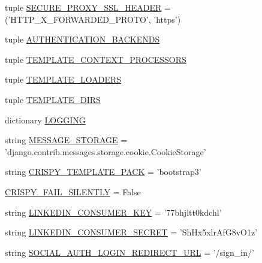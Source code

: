 \begin{DoxyCompactItemize}
tuple \hyperlink{namespaceleapkit_1_1settings_1_1base__settings__local_ad6825b5757c72d05e2a1f900736ebe11}{S\-E\-C\-U\-R\-E\-\_\-\-P\-R\-O\-X\-Y\-\_\-\-S\-S\-L\-\_\-\-H\-E\-A\-D\-E\-R} = ('H\-T\-T\-P\-\_\-\-X\-\_\-\-F\-O\-R\-W\-A\-R\-D\-E\-D\-\_\-\-P\-R\-O\-T\-O', 'https')
\item 
tuple \hyperlink{namespaceleapkit_1_1settings_1_1base__settings__local_a6f21fb23c56e83f779bdafbae0f1f2de}{A\-U\-T\-H\-E\-N\-T\-I\-C\-A\-T\-I\-O\-N\-\_\-\-B\-A\-C\-K\-E\-N\-D\-S}
\item 
tuple \hyperlink{namespaceleapkit_1_1settings_1_1base__settings__local_ac5c82a1f7d9b49e7795440b5bdcc4d73}{T\-E\-M\-P\-L\-A\-T\-E\-\_\-\-C\-O\-N\-T\-E\-X\-T\-\_\-\-P\-R\-O\-C\-E\-S\-S\-O\-R\-S}
\item 
tuple \hyperlink{namespaceleapkit_1_1settings_1_1base__settings__local_a4d3aea07c3fb548eda4abf846e9f396f}{T\-E\-M\-P\-L\-A\-T\-E\-\_\-\-L\-O\-A\-D\-E\-R\-S}
\item 
tuple \hyperlink{namespaceleapkit_1_1settings_1_1base__settings__local_a6c20dac1e8a2669ee57c65b45fb66bbf}{T\-E\-M\-P\-L\-A\-T\-E\-\_\-\-D\-I\-R\-S}
\item 
dictionary \hyperlink{namespaceleapkit_1_1settings_1_1base__settings__local_a09597bb472de58a72c8ca258d2284db5}{L\-O\-G\-G\-I\-N\-G}
\item 
string \hyperlink{namespaceleapkit_1_1settings_1_1base__settings__local_a9a45f01b8d46d421bcbe726db679a13b}{M\-E\-S\-S\-A\-G\-E\-\_\-\-S\-T\-O\-R\-A\-G\-E} = 'django.\-contrib.\-messages.\-storage.\-cookie.\-Cookie\-Storage'
\item 
string \hyperlink{namespaceleapkit_1_1settings_1_1base__settings__local_ac8a2edc6a65e4bdd8907307ef05d4a74}{C\-R\-I\-S\-P\-Y\-\_\-\-T\-E\-M\-P\-L\-A\-T\-E\-\_\-\-P\-A\-C\-K} = 'bootstrap3'
\item 
\hyperlink{namespaceleapkit_1_1settings_1_1base__settings__local_ad39d898eecd86bcc09d70f9c98be5e52}{C\-R\-I\-S\-P\-Y\-\_\-\-F\-A\-I\-L\-\_\-\-S\-I\-L\-E\-N\-T\-L\-Y} = False
\item 
string \hyperlink{namespaceleapkit_1_1settings_1_1base__settings__local_ad6e82d4726f5bca63d24aa2954e09582}{L\-I\-N\-K\-E\-D\-I\-N\-\_\-\-C\-O\-N\-S\-U\-M\-E\-R\-\_\-\-K\-E\-Y} = '77bhjltt0kdchl'
\item 
string \hyperlink{namespaceleapkit_1_1settings_1_1base__settings__local_aea1b86fb9cd1ee7c8ab2bec61d03d296}{L\-I\-N\-K\-E\-D\-I\-N\-\_\-\-C\-O\-N\-S\-U\-M\-E\-R\-\_\-\-S\-E\-C\-R\-E\-T} = 'Sh\-Hx5xlr\-Af\-G8v\-O1z'
\item 
string \hyperlink{namespaceleapkit_1_1settings_1_1base__settings__local_a327bbc30b5cde4ebdbe0358e53fd7304}{S\-O\-C\-I\-A\-L\-\_\-\-A\-U\-T\-H\-\_\-\-L\-O\-G\-I\-N\-\_\-\-R\-E\-D\-I\-R\-E\-C\-T\-\_\-\-U\-R\-L} = '/sign\-\_\-in/'

\end{DoxyCompactItemize}
